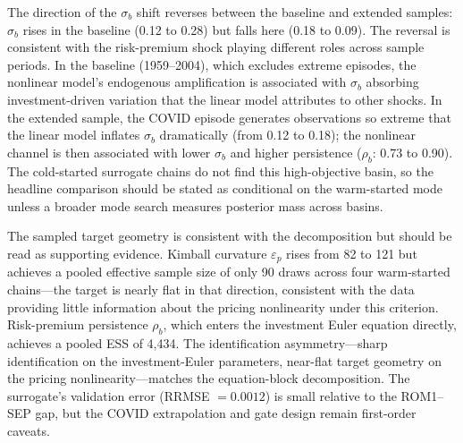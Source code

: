 \documentclass[12pt]{article}
\theoremstyle{plain}
\theoremstyle{definition}
\theoremstyle{remark}
\begin{document}
The direction of the $\sigma_b$ shift reverses between the baseline and extended samples: $\sigma_b$ rises in the baseline (0.12 to 0.28) but falls here (0.18 to 0.09). The reversal is consistent with the risk-premium shock playing different roles across sample periods. In the baseline (1959--2004), which excludes extreme episodes, the nonlinear model's endogenous amplification is associated with $\sigma_b$ absorbing investment-driven variation that the linear model attributes to other shocks. In the extended sample, the COVID episode generates observations so extreme that the linear model inflates $\sigma_b$ dramatically (from 0.12 to 0.18); the nonlinear channel is then associated with lower $\sigma_b$ and higher persistence ($\rho_b$: 0.73 to 0.90). The cold-started surrogate chains do not find this high-objective basin, so the headline comparison should be stated as conditional on the warm-started mode unless a broader mode search measures posterior mass across basins.

The sampled target geometry is consistent with the decomposition but should be read as supporting evidence. Kimball curvature $\varepsilon_p$ rises from 82 to 121 but achieves a pooled effective sample size of only 90 draws across four warm-started chains---the target is nearly flat in that direction, consistent with the data providing little information about the pricing nonlinearity under this criterion. Risk-premium persistence $\rho_b$, which enters the investment Euler equation directly, achieves a pooled ESS of 4{,}434. The identification asymmetry---sharp identification on the investment-Euler parameters, near-flat target geometry on the pricing nonlinearity---matches the equation-block decomposition. The surrogate's validation error (RRMSE $= 0.0012$) is small relative to the ROM1--SEP gap, but the COVID extrapolation and gate design remain first-order caveats.
\end{document}

